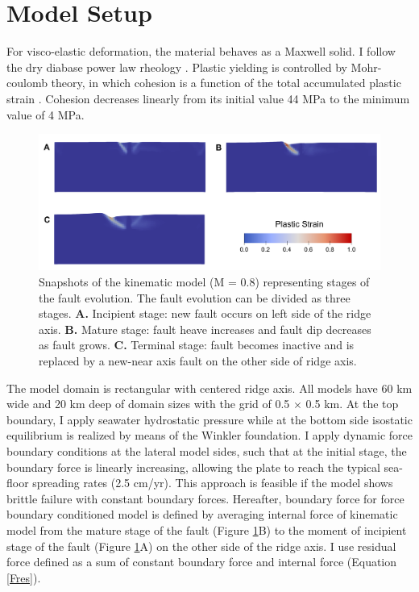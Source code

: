 \documentclass[letterpaper,12pt,notitle]{memphisthesis}                     %
\begin{document}
\section{Model Setup}
For visco-elastic deformation, the material behaves as a Maxwell solid. I follow the dry diabase power law rheology \citep{Kirby1987, Chen1990}. Plastic yielding is controlled by Mohr-coulomb theory, in which cohesion is a function of the total accumulated plastic strain \citep{Poliakov1998}. Cohesion decreases linearly from its initial value 44 MPa to the minimum value of 4 MPa.

\begin{figure}[!htb]
	\centering
	\includegraphics[width=0.9\linewidth]{./figs/fault_stage.pdf}
	\caption{ Snapshots of the kinematic model (M = 0.8) representing stages of the fault evolution. The fault evolution can be divided as three stages. \textbf{A.} Incipient stage: new fault occurs on left side of the ridge axis.  \textbf{B.} Mature stage: fault heave increases and fault dip decreases as fault grows. \textbf{C.} Terminal stage: fault becomes inactive and is replaced by a new-near axis fault on the other side of ridge axis.}
	\label{fig:faultstage}
\end{figure}

The model domain is rectangular with centered ridge axis. All models have 60 km wide and 20 km deep of domain sizes with the grid of 0.5 $\times$ 0.5 km. At the top boundary, I apply seawater hydrostatic pressure while at the bottom side isostatic equilibrium is realized by means of the Winkler foundation. I apply dynamic force boundary conditions at the lateral model sides, such that at the initial stage, the boundary force is linearly increasing, allowing the plate to reach the typical sea-floor spreading rates (2.5 cm/yr). This approach is feasible if the model shows brittle failure with constant boundary forces. Hereafter, boundary force for force boundary conditioned model is defined by averaging internal force of kinematic model from the mature stage of the fault (Figure \ref{fig:faultstage}B) to the moment of incipient stage of the fault (Figure \ref{fig:faultstage}A) on the other side of the ridge axis. I use residual force defined as a sum of constant boundary force and internal force (Equation \ref{Fres}).
\end{document}
